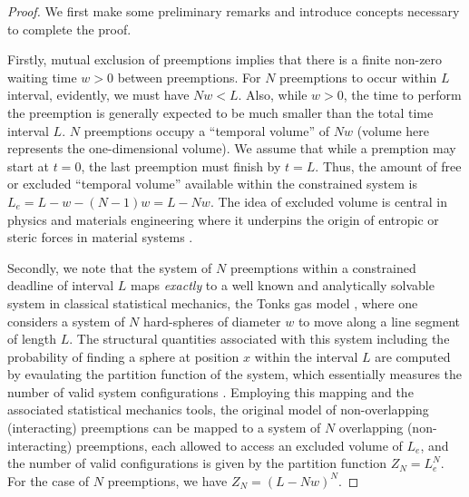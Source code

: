 \begin{proof}
We first make some preliminary remarks and introduce concepts necessary to complete the proof. 

Firstly, mutual exclusion of preemptions implies that there is a finite non-zero waiting time $w>0$ between preemptions. 
For $N$ preemptions to occur within $L$ interval, evidently, we must have $Nw < L$. Also, while $w >0$, the time to perform the preemption is generally expected to be much smaller than the total time interval $L$.
$N$ preemptions occupy a ``temporal volume'' of $Nw$ (volume here represents the one-dimensional volume). We assume that while a premption may start at $t=0$, the last preemption must finish by $t = L$. Thus, the amount of free or excluded ``temporal volume'' available within the constrained system is $L_e = L - w - (N-1)w = L - Nw$.
The idea of excluded volume is central in physics and materials engineering where it underpins the origin of entropic or steric forces in material systems \cite{krauth2006statistical,jing2015ionic}. 

Secondly, we note that the system of $N$ preemptions within a constrained deadline of interval $L$ maps \emph{exactly} to a well known and analytically solvable system in classical statistical mechanics, the Tonks gas model \cite{tonks}, where one considers a system of $N$ hard-spheres of diameter $w$ to move along a line segment of length $L$. The structural quantities associated with this system including the probability of finding a sphere at position $x$ within the interval $L$ are computed by evaulating the partition function of the system, which essentially measures the number of valid system configurations \cite{krauth2006statistical}. Employing this mapping and the associated statistical mechanics tools, the original model of non-overlapping (interacting) preemptions can be mapped to a system of $N$ overlapping (non-interacting) preemptions, each allowed to access an excluded volume of $L_e$, and the number of valid configurations is given by the partition function $Z_N = L_e^N$. For the case of $N$ preemptions, we have $Z_N = (L- Nw)^N$.


\end{proof}
